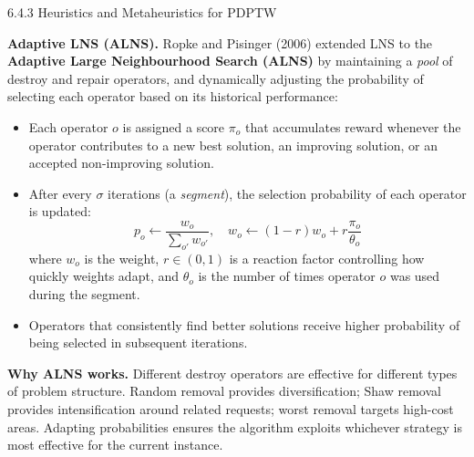 \documentclass[aspectratio=169,10pt]{beamer}
\begin{document}
\begin{frame}[allowframebreaks]{6.4.3 Heuristics and Metaheuristics for PDPTW}
  \framebreak

  \textbf{Adaptive LNS (ALNS).} Ropke and Pisinger (2006) extended LNS to the
  \textbf{Adaptive Large Neighbourhood Search (ALNS)} by maintaining a \emph{pool} of
  destroy and repair operators, and dynamically adjusting the probability of selecting
  each operator based on its historical performance:

  \begin{itemize}
    \item Each operator $o$ is assigned a score $\pi_o$ that accumulates reward whenever
          the operator contributes to a new best solution, an improving solution, or an
          accepted non-improving solution.
    \item After every $\sigma$ iterations (a \emph{segment}), the selection probability of
          each operator is updated:
          \[
            p_o \leftarrow \frac{w_o}{\sum_{o'} w_{o'}}, \quad
            w_o \leftarrow (1-r) w_o + r \frac{\pi_o}{\theta_o}
          \]
          where $w_o$ is the weight, $r \in (0,1)$ is a reaction factor controlling how
          quickly weights adapt, and $\theta_o$ is the number of times operator $o$ was
          used during the segment.
    \item Operators that consistently find better solutions receive higher probability
          of being selected in subsequent iterations.
  \end{itemize}

  \textbf{Why ALNS works.} Different destroy operators are effective for different types
  of problem structure. Random removal provides diversification; Shaw removal provides
  intensification around related requests; worst removal targets high-cost areas.
  Adapting probabilities ensures the algorithm exploits whichever strategy is most
  effective for the current instance.

  \framebreak


\end{frame}
\end{document}
